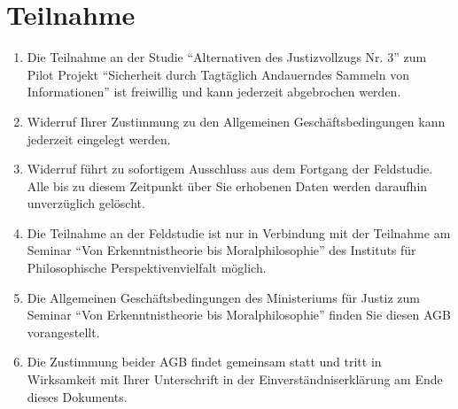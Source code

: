 \documentclass[a4paper, 12pt]{scrartcl}
\begin{document}
    \section{Teilnahme}
    \begin{enumerate}
        \item Die Teilnahme an der Studie \enquote{Alternativen des Justizvollzugs Nr. 3} zum Pilot Projekt \enquote{Sicherheit durch Tagt\"aglich Andauerndes Sammeln von Informationen} ist freiwillig und kann jederzeit abgebrochen werden.

        \item Widerruf Ihrer Zustimmung zu den Allgemeinen Gesch\"aftsbedingungen kann jederzeit eingelegt werden.
        
        \item Widerruf f\"uhrt zu sofortigem Ausschluss aus dem Fortgang der Feldstudie. Alle bis zu diesem Zeitpunkt \"uber Sie erhobenen Daten werden daraufhin unverz\"uglich gel\"oscht.
        
        \item Die Teilnahme an der Feldstudie ist nur in Verbindung mit der Teilnahme am Seminar \enquote{Von Erkenntnistheorie bis Moralphilosophie} des Instituts f\"ur Philosophische Perspektivenvielfalt m\"oglich.
        
        \item Die Allgemeinen Gesch\"aftsbedingungen des Ministeriums f\"ur Justiz zum Seminar \enquote{Von Erkenntnistheorie bis Moralphilosophie} finden Sie diesen AGB vorangestellt.
        
        \item Die Zustimmung beider AGB findet gemeinsam statt und tritt in Wirksamkeit mit Ihrer Unterschrift in der Einverst\"andniserkl\"arung am Ende dieses Dokuments.
    \end{enumerate}
\end{document}
